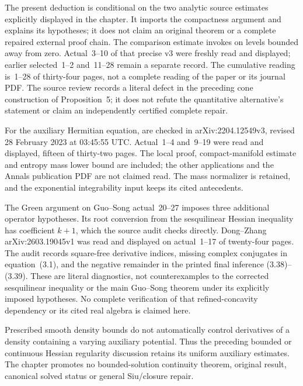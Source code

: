 The present deduction is conditional on the two analytic
source estimates explicitly displayed in the chapter.
It imports the compactness argument and explains its
hypotheses; it does not claim an original theorem or a
complete repaired external proof chain. The comparison
estimate invokes \cite[Proposition~6]{Szekelyhidi15FullyNonlinearV3}
on levels bounded away from zero. Actual~3--10 of that
precise v3 were freshly read and displayed; earlier
selected~1--2 and~11--28 remain a separate record.
The cumulative reading is~1--28 of thirty-four pages,
not a complete reading of the paper or its journal PDF.
The source review records a literal defect in the
preceding cone construction of Proposition~5; it does
not refute the quantitative alternative's statement or
claim an independently certified complete repair.

For the auxiliary Hermitian equation,
\cite[Theorem~1 and Corollary~1]{GuoPhong23LinftyV3}
are checked in arXiv:\allowbreak 2204.12549v3, revised
28 February 2023 at 03:45:55 UTC. Actual~1--4 and~9--19
were read and displayed, fifteen of thirty-two pages.
The local proof, compact-manifold estimate and entropy
mass lower bound are included; the other applications
and the Annals publication PDF are not claimed read.
The mass normalizer is retained, and the exponential
integrability input keeps its cited antecedents.

The Green argument on Guo--Song actual~20--27 imposes
three additional operator hypotheses. Its root conversion
from the sesquilinear Hessian inequality has coefficient
$k+1$, which the source audit checks directly. Dong--Zhang
arXiv:\allowbreak 2603.19045v1 was read and displayed on
actual~1--17 of twenty-four pages. The audit records
square-free derivative indices, missing complex
conjugates in equation~(3.1), and the negative remainder
in the printed final inference (3.38)--(3.39).
These are literal diagnostics, not counterexamples to
the corrected sesquilinear inequality or the main
Guo--Song theorem under its explicitly imposed hypotheses.
No complete verification of that refined-concavity
dependency or its cited real algebra is claimed here.

Prescribed smooth density bounds do not automatically
control derivatives of a density containing a varying
auxiliary potential. Thus the preceding bounded or
continuous Hessian regularity discussion retains its
uniform auxiliary estimates. The chapter promotes no
bounded-solution continuity theorem, original result,
canonical solved status or general Siu/closure repair.

